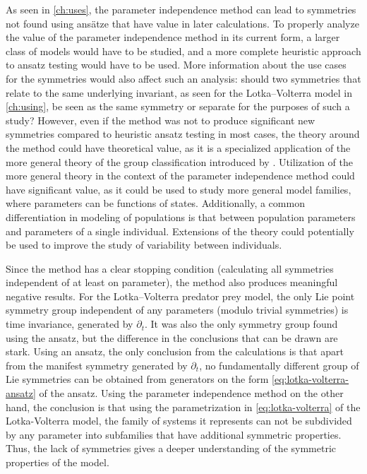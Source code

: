 As seen in \cref{ch:uses}, the parameter independence method can lead to symmetries not found using ansätze that have value in later calculations.
To properly analyze the value of the parameter independence method in its current form, a larger class of models would have to be studied, and a more complete heuristic approach to ansatz testing would have to be used.
More information about the use cases for the symmetries would also affect such an analysis: should two symmetries that relate to the same underlying invariant, as seen for the Lotka--Volterra model in \cref{ch:using}, be seen as the same symmetry or separate for the purposes of such a study?
However, even if the method was not to produce significant new symmetries compared to heuristic ansatz testing in most cases, the theory around the method could have theoretical value, as it is a specialized application of the more general theory of the group classification introduced by \citeauthor{ovsiannikov1982group} \cite{ovsiannikov1982group}.
Utilization of the more general theory in the context of the parameter independence method could have significant value, as it could be used to study more general model families, where parameters can be functions of states.
Additionally, a common differentiation in modeling of populations is that between population parameters and parameters of a single individual.
Extensions of the theory could potentially be used to improve the study of variability between individuals.

Since the method has a clear stopping condition (calculating all symmetries independent of at least on parameter), the method also produces meaningful negative results.
For the Lotka--Volterra predator prey model, the only Lie point symmetry group independent of any parameters (modulo trivial symmetries) is time invariance, generated by \(\partial_t\).
It was also the only symmetry group found using the ansatz, but the difference in the conclusions that can be drawn are stark.
Using an ansatz, the only conclusion from the calculations is that apart from the manifest symmetry generated by \(\partial_t\), no fundamentally different group of Lie symmetries can be obtained from generators on the form \cref{eq:lotka-volterra-ansatz} of the ansatz.
Using the parameter independence method on the other hand, the conclusion is that using the parametrization in \cref{eq:lotka-volterra} of the Lotka-Volterra model, the family of systems it represents can not be subdivided by any parameter into subfamilies that have additional symmetric properties.
Thus, the lack of symmetries gives a deeper understanding of the symmetric properties of the model.

